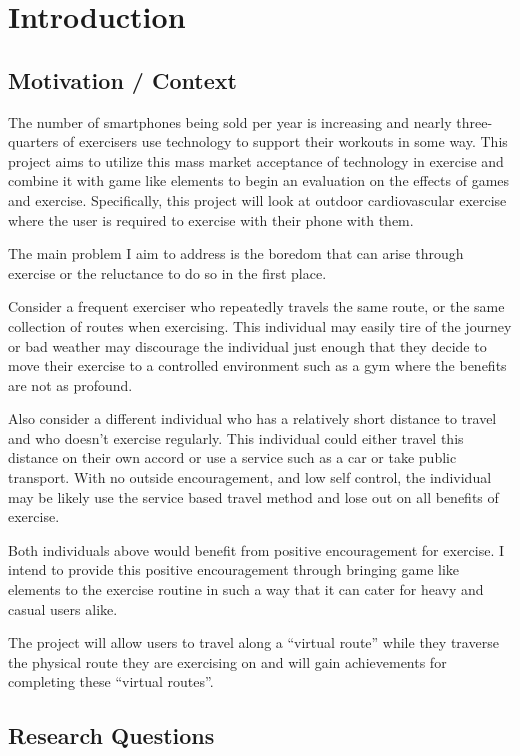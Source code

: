 \chapter{Introduction}\label{ch_intro}

\section{Motivation / Context}
The number of smartphones being sold per year is
increasing\cite{phones_gartner, phones_guardian} and nearly
three-quarters of exercisers use technology to support their
workouts in some way\cite{lifefitness}. This project aims to utilize this mass market
acceptance of technology in exercise and combine it with game like
elements to begin an evaluation on the effects of games and
exercise. Specifically, this project will look at outdoor
cardiovascular exercise where the user is required to exercise with
their phone with them.

The main problem I aim to address is the boredom that can arise
through exercise or the reluctance to do so in the first
place. 

Consider a frequent exerciser who repeatedly travels the same route,
or the same collection of routes when exercising. This individual may
easily tire of the journey or bad weather may discourage the
individual just enough that they decide to move their exercise to a
controlled environment such as a gym where the benefits are not as profound.

Also consider a different individual who has a relatively short distance to
travel and who doesn't exercise regularly. This individual could
either travel this distance on their own accord or use a service such
as a car or take public transport. With no outside encouragement, and
low self control, the individual may be likely use the service based
travel method and lose out on all benefits of exercise.

Both individuals above would benefit from positive encouragement for
exercise. I intend to provide this positive encouragement through
bringing game like elements to the exercise routine in such a way that
it can cater for heavy and casual users alike.

The project will allow users to travel along a ``virtual route''
while they traverse the physical route they are exercising on and will
gain achievements for completing these ``virtual routes''.

\section{Research Questions}

